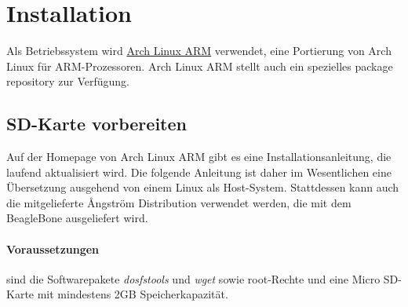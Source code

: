 \section{Installation}
Als Betriebssystem wird \href{http://archlinuxarm.org/}{Arch Linux ARM} verwendet, eine Portierung von Arch Linux für ARM-Prozessoren. Arch Linux ARM stellt auch ein spezielles package repository zur Verfügung.

\subsection{SD-Karte vorbereiten}
Auf der Homepage von Arch Linux ARM gibt es eine Installationsanleitung, die laufend aktualisiert wird. Die folgende Anleitung ist daher im Wesentlichen eine Übersetzung ausgehend von einem Linux als Host-System. Stattdessen kann auch die mitgelieferte {\AA}ngström Distribution verwendet werden, die mit dem BeagleBone ausgeliefert wird.

\paragraph{Voraussetzungen} sind die Softwarepakete \textit{dosfstools} und \textit{wget} sowie root-Rechte und eine Micro SD-Karte mit mindestens 2GB Speicherkapazität.

